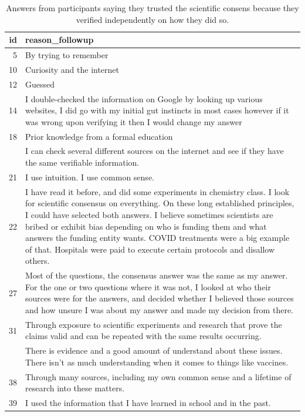 \documentclass[
  doc,floatsintext]{apa6}
\begin{document}
\begin{longtable}[t]{>{}r>{\raggedright\arraybackslash}p{30em}}
\caption{\label{tab:exp3-independent-verification}Answers from participants saying they trusted the scientific consens because they verified independently on how they did so.}\\
\toprule
id & reason\_followup\\
\midrule
5 & By trying to remember\\
10 & Curiosity and the internet\\
12 & Guessed\\
14 & I double-checked the information on Google by looking up various websites, I did go with my initial gut instincts in most cases however if it was wrong upon verifying it then I would change my answer\\
18 & Prior knowledge from a formal education\\
\addlinespace
19 & I can check several different sources on the internet and see if they have the same verifiable information.\\
21 & I use intuition.  I use common sense.\\
22 & I have read it before, and did some experiments in chemistry class.  I look for scientific consensus on everything.  On these long established principles, I could have selected both answers.  I believe sometimes scientists are bribed or exhibit bias depending on who is funding them and what answers the funding entity wants. COVID treatments were a big example of that.  Hospitals were paid to execute certain protocols and disallow others.\\
27 & Most of the questions, the consensus answer was the same as my answer. For the one or two questions where it was not, I looked at who their sources were for the answers, and decided whether I believed those sources and how unsure I was about my answer and made my decision from there.\\
31 & Through exposure to scientific experiments and research that prove the claims valid and can be repeated with the same results occurring.\\
\addlinespace
36 & There is evidence and a good amount of understand about these issues. There isn't as much understanding when it comes to things like vaccines.\\
38 & Through many sources, including my own common sense and a lifetime of research into these matters.\\
39 & I used the information that I have learned in school and in the past.\\

\end{longtable}
\end{document}
